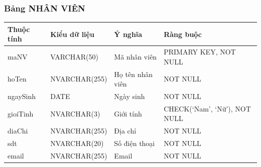 \documentclass[a4paper,12pt]{report}
\begin{document}
\subsubsection{Bảng NHÂN VIÊN}
\noindent
\begin{center}
    \begin{longtable}{|>{\centering\arraybackslash}p{2.7cm}|
        >{\centering\arraybackslash}p{4.5cm}|
        >{\centering\arraybackslash}p{3.8cm}|
        >{\centering\arraybackslash}p{4cm}|}
        \hline
        \textbf{Thuộc tính}                                                                                                               &
        \textbf{Kiểu dữ liệu}                                                                                                                             &
        \textbf{Ý nghĩa}                                                                                                 &
        \textbf{Ràng buộc}                                                                                                         \\
        \hline
        maNV &  VARCHAR(50)  & Mã nhân viên & PRIMARY KEY, NOT NULL \\
        \hline
        hoTen &  NVARCHAR(255)  & Họ tên nhân viên & NOT NULL \\                                                                                                                          
        \hline
        ngaySinh & DATE & Ngày sinh & NOT NULL \\                                                                                                                          
        \hline
        gioiTinh & NVARCHAR(3) & Giới tính & CHECK(‘Nam’, ‘Nữ’), NOT NULL \\                                                                                                                          
        \hline
        diaChi & NVARCHAR(255) & Địa chỉ & NOT NULL \\                                                                                                                          
        \hline
        sdt & NVARCHAR(20) & Số điện thoại & NOT NULL \\                                                                                                                          
        \hline
        email & NVARCHAR(255) & Email & NOT NULL \\                                                                                                                          

\end{longtable}
\end{center}
\end{document}
